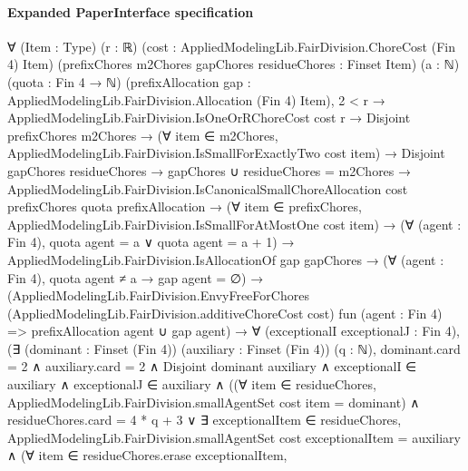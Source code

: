 \documentclass[10pt]{article}
\begin{document}
\paragraph{Expanded PaperInterface specification}
\begin{ReviewVerbatim}
∀ (Item : Type) (r : ℝ) (cost : AppliedModelingLib.FairDivision.ChoreCost (Fin 4) Item)
  (prefixChores m2Chores gapChores residueChores : Finset Item) (a : ℕ) (quota : Fin 4 → ℕ)
  (prefixAllocation gap : AppliedModelingLib.FairDivision.Allocation (Fin 4) Item),
  2 < r →
    AppliedModelingLib.FairDivision.IsOneOrRChoreCost cost r →
      Disjoint prefixChores m2Chores →
        (∀ item ∈ m2Chores, AppliedModelingLib.FairDivision.IsSmallForExactlyTwo cost item) →
          Disjoint gapChores residueChores →
            gapChores ∪ residueChores = m2Chores →
              AppliedModelingLib.FairDivision.IsCanonicalSmallChoreAllocation cost prefixChores quota prefixAllocation →
                (∀ item ∈ prefixChores, AppliedModelingLib.FairDivision.IsSmallForAtMostOne cost item) →
                  (∀ (agent : Fin 4), quota agent = a ∨ quota agent = a + 1) →
                    AppliedModelingLib.FairDivision.IsAllocationOf gap gapChores →
                      (∀ (agent : Fin 4), quota agent ≠ a → gap agent = ∅) →
                        (AppliedModelingLib.FairDivision.EnvyFreeForChores
                            (AppliedModelingLib.FairDivision.additiveChoreCost cost) fun (agent : Fin 4) =>
                            prefixAllocation agent ∪ gap agent) →
                          ∀ (exceptionalI exceptionalJ : Fin 4),
                            (∃ (dominant : Finset (Fin 4)) (auxiliary : Finset (Fin 4)) (q : ℕ),
                                dominant.card = 2 ∧
                                  auxiliary.card = 2 ∧
                                    Disjoint dominant auxiliary ∧
                                      exceptionalI ∈ auxiliary ∧
                                        exceptionalJ ∈ auxiliary ∧
                                          ((∀ item ∈ residueChores,
                                                AppliedModelingLib.FairDivision.smallAgentSet cost item = dominant) ∧
                                              residueChores.card = 4 * q + 3 ∨
                                            ∃ exceptionalItem ∈ residueChores,
                                              AppliedModelingLib.FairDivision.smallAgentSet cost exceptionalItem =
                                                  auxiliary ∧
                                                (∀ item ∈ residueChores.erase exceptionalItem,

\end{ReviewVerbatim}
\end{document}
